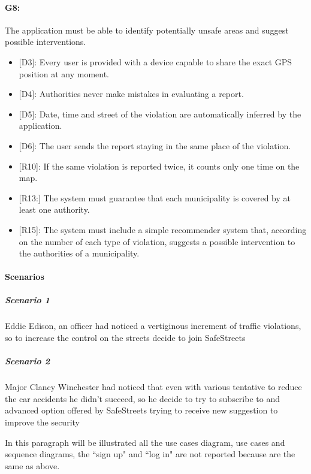 \documentclass[12pt,a4paper]{report}
\begin{document}
			\paragraph {G8:} The application must be able to identify potentially unsafe areas and suggest possible interventions.
				\begin{itemize}
					\item{[D3]:} Every user is provided with a device capable to share the exact GPS position at any moment.
			 		\item{[D4]:} Authorities never make mistakes in evaluating a report.
					\item{[D5]:} Date, time and street of the violation are automatically inferred by the application.
			 		\item{[D6]:} The user sends the report staying in the same place of the violation.
				\end{itemize}
				\begin{itemize}
					\item{[R10]:} If the same violation is reported twice, it counts only one time on the map.
					\item{[R13:]} The system must guarantee that each municipality is covered by at least one authority.
					\item{[R15]:} The system must include a simple recommender system that, according on the number of each type of violation, suggests a possible intervention to the authorities of a municipality.
				\end{itemize}

\paragraph{Scenarios}
				\subparagraph{Scenario 1}
					Eddie Edison, an officer had noticed a vertiginous increment of traffic violations, so to increase the control
					on the streets decide to join SafeStreets
					
				\subparagraph{Scenario 2}
					Major Clancy Winchester had noticed that even with various tentative to reduce the car accidents he didn't
					succeed, so he decide to try to subscribe to and advanced option offered by SafeStreets trying to receive
					new suggestion to improve the security
					
				In this paragraph will be illustrated all the use cases diagram, use cases and sequence diagrams, the ``sign up" and ``log in"
				are not reported because are the same as above.
\end{document}
